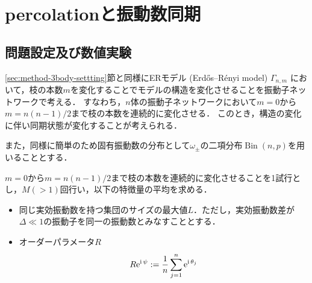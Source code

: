 \documentclass[../main]{subfiles}
\begin{document}
\chapter{percolationと振動数同期}
\label{chap:percolation}
\section{問題設定及び数値実験}
\ref{sec:method-3body-settting}節と同様にERモデル (Erd\H{o}s–R\'{e}nyi model) $\Gamma_{n,m}$ において，枝の本数$m$を変化することでモデルの構造を変化させることを振動子ネットワークで考える．
すなわち，$n$体の振動子ネットワークにおいて$m=0$から$m=n(n-1)/2$まで枝の本数を連続的に変化させる．
このとき，構造の変化に伴い同期状態が変化することが考えられる．

また，同様に簡単のため固有振動数の分布として$\omega_\pm$の二項分布$\operatorname{Bin}(n,p)$を用いることとする．

$m=0$から$m=n(n-1)/2$まで枝の本数を連続的に変化させることを1試行とし，$M(>1)$回行い，以下の特徴量の平均を求める．
\begin{itemize}
    \item 
    同じ実効振動数を持つ集団のサイズの最大値$L$．ただし，実効振動数差が$\Delta\ll 1$の振動子を同一の振動数とみなすこととする．
    \item
    オーダーパラメータ$R$
    \begin{align*}
        R\mathrm{e}^{{\mathrm i\,} \psi}:=\frac{1}{n}\sum_{j=1}^n\mathrm{e}^{{\mathrm i\,} \theta_j}    
    \end{align*}
\end{itemize}
\end{document}
